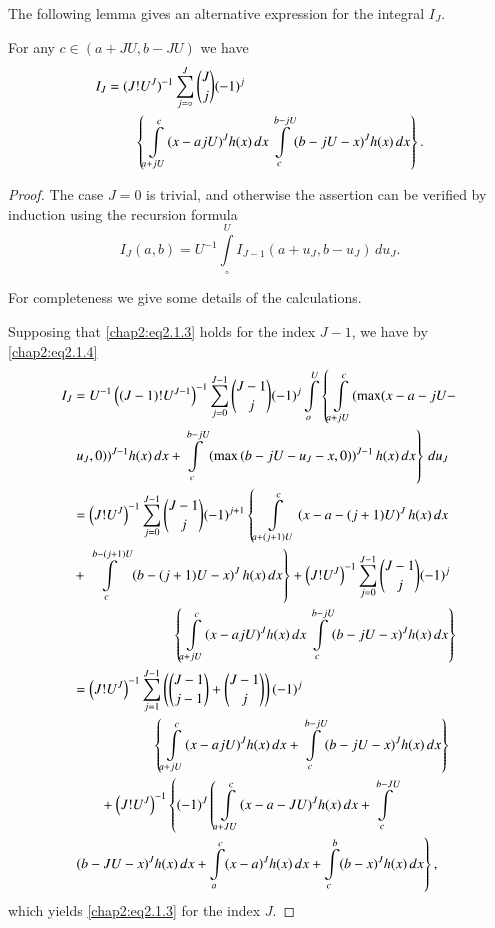 The following lemma gives an alternative expression for the integral
$I_J$. 
\begin{lem}\label{chap2:lem2.1}
For any $c\in(a+JU, b-JU)$ we have 
\begin{align}\label{chap2:eq2.1.3}
I_J & =(J!U^J)^{-1}\sum\limits_{j=\circ}^J\binom{J}{j}
(-1)^j\\ 
& \qquad \left\{\int\limits_{a+jU}^c(x-ajU)^Jh(x)\,
dx\int\limits_c^{b-jU}(b-jU-x)^Jh(x)\,dx\right\}.\notag
\end{align}
\end{lem}

\begin{proof}
The case $J=0$ is trivial, and otherwise the assertion can be verified
by induction using the recursion formula 
\begin{equation}\label{chap2:eq2.1.4}
I_J(a,b)=U^{-1}\int\limits_\circ^U I_{J-1}(a+u_J, b-u_J)\,du_J.
\end{equation}

For completeness we give some details of the calculations.

Supposing that \eqref{chap2:eq2.1.3} holds for the index $J-1$, we
have by \eqref{chap2:eq2.1.4}
\begin{align*}
I_J &=U^{-1}\left((J-1)!U^{J-1}\right)^{-1}\sum\limits_{j=0}^{J-1}
\binom{J-1}{j}(-1)^j\int\limits_o^U\left\{ \int\limits_{a+jU}^c
(\max(x-a -jU-\right.\\
&\left. u_J,0))^{J-1}h(x)\,dx
+\int\limits_c^{b-jU}\left(\max\left(b-jU-u_J-x,0 
\right)\right)^{J-1}h(x)\,dx\right\}\,du_J\\
&= \left(J!U^J\right)^{-1} \sum\limits_{j=0}^{J-1}\binom{J-1}{j}
(-1)^{j+1}\left\{ \int\limits_{a+(j+1)U}^c\left(x-a-(j+1)U\right)^J
h(x)\,dx\right.\\
& +\left.\int\limits_c^{b-(j+1)U}\left(b-(j+1)U-x\right)^J
h(x)\,dx \right\}+ \left(J!U^J\right)^{-1}\sum\limits_{j=0}^{J-1}\binom{J-1}{j}
(-1)^j \\
& \hspace{2.5cm} \left\{
\int\limits_{a+jU}^c(x-ajU)^Jh(x)\,dx\int\limits_c^{b-jU}(b-jU-x)^Jh(x)\,dx\right\}\\  
&= \left(J!U^J\right)^{-1}\sum\limits_{j=1}^{J-1}\left(
\binom{J-1}{j-1}+\binom{J-1}{j}\right)(-1)^j\\
& \hspace{2cm} \left\{
\int\limits_{a+jU}^c (x-ajU)^Jh(x)\,dx + \int\limits_c^{b-jU}
(b-jU-x)^Jh (x)\,dx\right\}\\
&\qquad +\left(J!U^J\right)^{-1} \left\{ (-1)^J\left(
\int\limits_{a+JU}^c (x-a-JU)^Jh(x)\,dx+\int\limits_c^{b-JU}\right.\right.\\
& \left.(b-JU-x)^J h(x)\,dx
+ \int\limits_a^c(x-a)^Jh(x)\,dx+\int\limits_c^b
(b-x)^J h(x)\,dx\right\},
\end{align*}\pageoriginale
which yields \eqref{chap2:eq2.1.3} for the index $J$.
\end{proof}

